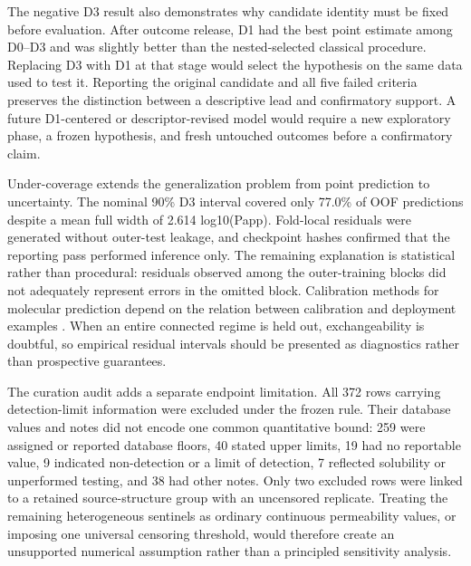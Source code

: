 \documentclass[referee,lineno,pdflatex,Numbered,sn-basic]{sn-jnl}
\begin{document}
The negative D3 result also demonstrates why candidate identity must be fixed before evaluation. After outcome release, D1 had the best point estimate among D0--D3 and was slightly better than the nested-selected classical procedure. Replacing D3 with D1 at that stage would select the hypothesis on the same data used to test it. Reporting the original candidate and all five failed criteria preserves the distinction between a descriptive lead and confirmatory support. A future D1-centered or descriptor-revised model would require a new exploratory phase, a frozen hypothesis, and fresh untouched outcomes before a confirmatory claim.

Under-coverage extends the generalization problem from point prediction to uncertainty. The nominal 90\% D3 interval covered only 77.0\% of OOF predictions despite a mean full width of 2.614 log10(Papp). Fold-local residuals were generated without outer-test leakage, and checkpoint hashes confirmed that the reporting pass performed inference only. The remaining explanation is statistical rather than procedural: residuals observed among the outer-training blocks did not adequately represent errors in the omitted block. Calibration methods for molecular prediction depend on the relation between calibration and deployment examples \cite{zhang2019bayesian,hirschfeld2020uncertainty,li2024conformalized}. When an entire connected regime is held out, exchangeability is doubtful, so empirical residual intervals should be presented as diagnostics rather than prospective guarantees.

The curation audit adds a separate endpoint limitation. All 372 rows carrying detection-limit information were excluded under the frozen rule. Their database values and notes did not encode one common quantitative bound: 259 were assigned or reported database floors, 40 stated upper limits, 19 had no reportable value, 9 indicated non-detection or a limit of detection, 7 reflected solubility or unperformed testing, and 38 had other notes. Only two excluded rows were linked to a retained source-structure group with an uncensored replicate. Treating the remaining heterogeneous sentinels as ordinary continuous permeability values, or imposing one universal censoring threshold, would therefore create an unsupported numerical assumption rather than a principled sensitivity analysis.
\end{document}
